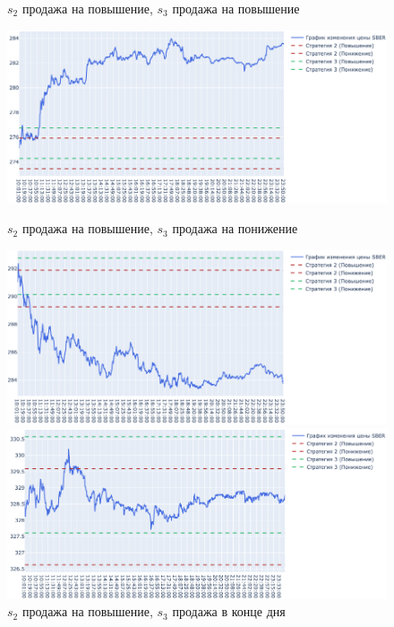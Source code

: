 \begin{center}
    \begin{figure}[h]
        \centering
        \caption{$s_2$ продажа на повышение, $s_3$ продажа на повышение}
        \includegraphics[keepaspectratio=true,scale=0.35]{images/chapter3/upup.png}
        
        \caption{$s_2$ продажа на повышение, $s_3$ продажа на понижение}
        \includegraphics[keepaspectratio=true,scale=0.35]{images/chapter3/updown.png}
        
        \caption{$s_2$ продажа на повышение, $s_3$ продажа в конце дня}
        \includegraphics[keepaspectratio=true,scale=0.35]{images/chapter3/upzero.png}
    \end{figure}
\end{center}


